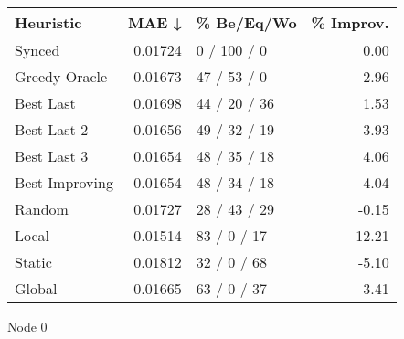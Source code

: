 \begin{tabular}{lrlr}
\toprule
\textbf{Heuristic} & \textbf{MAE ↓} & \textbf{\% Be/Eq/Wo} & \textbf{\% Improv.} \\
\midrule
            Synced &        0.01724 &          0 / 100 / 0 &                0.00 \\
     Greedy Oracle &        0.01673 &          47 / 53 / 0 &                2.96 \\
         Best Last &        0.01698 &         44 / 20 / 36 &                1.53 \\
       Best Last 2 &        0.01656 &         49 / 32 / 19 &                3.93 \\
       Best Last 3 &        0.01654 &         48 / 35 / 18 &                4.06 \\
    Best Improving &        0.01654 &         48 / 34 / 18 &                4.04 \\
            Random &        0.01727 &         28 / 43 / 29 &               -0.15 \\
             Local &        0.01514 &          83 / 0 / 17 &               12.21 \\
            Static &        0.01812 &          32 / 0 / 68 &               -5.10 \\
            Global &        0.01665 &          63 / 0 / 37 &                3.41 \\
\bottomrule
\end{tabular}
\caption{Node 0}
\label{tab:non_lr01_le1_bs4_0}
